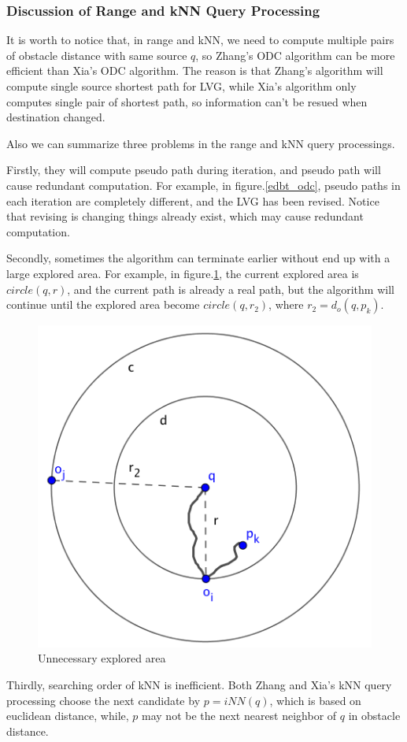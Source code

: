 \subsubsection{Discussion of Range and kNN Query Processing}\label{disknn}
It is worth to notice that, in range and kNN, we need to compute multiple pairs of obstacle distance with same
source $q$, so Zhang's ODC algorithm can be more efficient than Xia's ODC algorithm.
The reason is that Zhang's algorithm will compute single source shortest path for LVG,
while Xia's algorithm only computes single pair of shortest path, so information can't be resued when destination changed.

Also we can summarize three problems in the range and kNN query processings.

Firstly, they will compute pseudo path during iteration, and pseudo path will cause redundant
computation. For example, in figure.\ref{edbt_odc}, pseudo paths in each iteration are
completely different, and the LVG has been revised. Notice that revising is changing things
already exist, which may cause redundant computation.

Secondly, sometimes the algorithm can terminate earlier without end up with a large explored
area. For example, in figure.\ref{tighter}, the current explored area is $circle(q, r)$, and
the current path is already a real path, but the algorithm will continue until the explored
area become $circle(q, r_2)$, where $r_2=d_o(q, p_k)$.
\begin{figure}[htp]
  \centering
  \includegraphics[width=.5\linewidth]{pic/tighter.png}
  \caption{Unnecessary explored area}
  \label{tighter}
\end{figure}

Thirdly, searching order of kNN is inefficient. Both Zhang and Xia's kNN query processing 
choose the next candidate by $p=iNN(q)$, which is based on euclidean distance,
while, $p$ may not be the next nearest neighbor of $q$ in obstacle distance.

